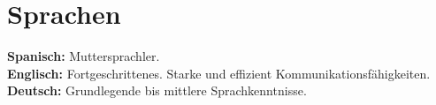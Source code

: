 \documentclass[letterpaper,11pt]{article}
\begin{document}
\section{Sprachen}
\begin{itemize}[leftmargin=0.15in, label={}]
   \small{\item{
    \textbf{Spanisch: }{Muttersprachler.} \\
    \textbf{Englisch: }{Fortgeschrittenes. Starke und effizient Kommunikationsfähigkeiten.} \\
    \textbf{Deutsch: }{Grundlegende bis mittlere Sprachkenntnisse.} \\
   }}
\end{itemize}
\end{document}
